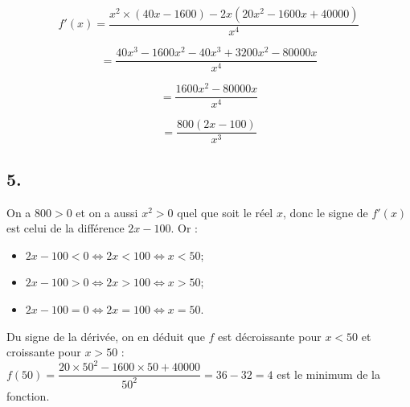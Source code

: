 \documentclass[10pt]{article}
\begin{document}
	\[ f'(x) = \dfrac{x^2 \times (40x - 1600) - 2x (20x^2 - 1600x + 40000)}{x^4} \]
	
	\[ = \dfrac{40x^3 - 1600x^2 - 40x^3 + 3200x^2 - 80000x}{x^4} \]
	
	\[ = \dfrac{1600x^2 - 80000x}{x^4} \]
	
	\[ = \dfrac{800(2x - 100)}{x^3} \]
	
	\subsection*{5.}
	
	
	On a \(800 > 0\) et on a aussi \(x^2 > 0\) quel que soit le réel \(x\), donc le signe de \(f'(x)\) est celui de la différence \(2x - 100\). Or :
	
	\begin{itemize}
		\item \(2x - 100 < 0 \iff 2x < 100 \iff x < 50\);
		\item \(2x - 100 > 0 \iff 2x > 100 \iff x > 50\);
		\item \(2x - 100 = 0 \iff 2x = 100 \iff x = 50\).
	\end{itemize}
	
	Du signe de la dérivée, on en déduit que \(f\) est décroissante pour \(x < 50\) et croissante pour \(x > 50\) :\\
	 \(f(50) = \dfrac{20 \times 50^2 - 1600 \times 50 + 40000}{50^2} = 36 - 32 = 4 \) est le minimum de la fonction.
\end{document}
